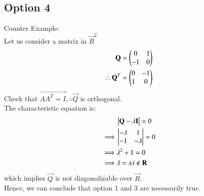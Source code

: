 \documentclass[journal,12pt,twocolumn]{IEEEtran}
\begin{document}
\subsection{Option 4}
Counter Example:\\
Let us consider a matrix  in $ \vec R^2 $
\begin{align}
    \mathbf Q= \begin{pmatrix} 0 & 1 \\-1 & 0\end{pmatrix}\\
    \therefore \mathbf Q^T =\begin{pmatrix} 0 & -1\\1 & 0\end{pmatrix}
\end{align}
Check that $\vec{AA^T= I},  \therefore \vec Q$ is orthogonal. \\
The characteristic equation is:
\begin{align}
    &\begin{vmatrix}\mathbf Q- \lambda\mathbf I\end{vmatrix}=0\\
    \implies & \begin{vmatrix}-\lambda & 1\\ -1 & -\lambda\end{vmatrix}=0\\
    \implies & \lambda^2 + 1 = 0\\
    \implies & \lambda= \pm i \notin \mathbf R
\end{align}
which implies $\vec Q$ is not diagonalizable over $\vec R$.\\

Hence, we can conclude that option 1 and 3 are necessarily true.
\end{document}

